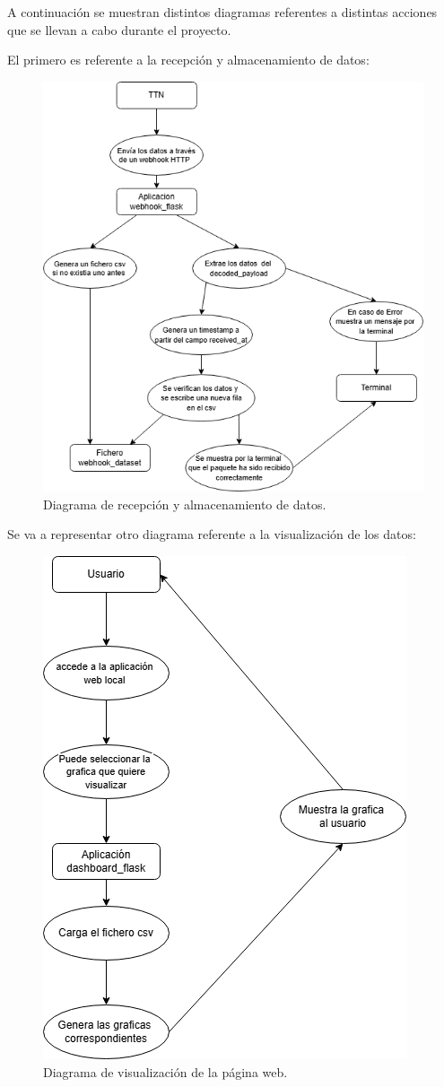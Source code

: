 A continuación se muestran distintos diagramas referentes a distintas acciones que se llevan a cabo durante el proyecto.

El primero es referente a la recepción y almacenamiento de datos:

\begin{figure}[H]
    \centering
    \includegraphics[width=0.8\linewidth]{img/diagrama_recep_alma}
    \caption{Diagrama de recepción y almacenamiento de datos.}
\end{figure}
Se va a representar otro diagrama referente a la visualización de los datos:

\begin{figure}[H]
    \centering
    \includegraphics[width=0.6\linewidth]{img/diagrama_visual}
    \caption{Diagrama de visualización de la página web.}
\end{figure}

